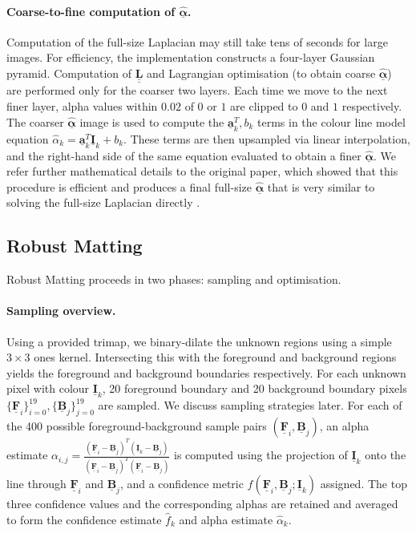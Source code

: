 \documentclass{article}
\theoremstyle{definition}
\def\vt#1{\underline{\mathbf{#1}}}
\def\vts#1{\underline{\boldsymbol{#1}}}
\def\mt#1{\underline{\underline{\mathbf{#1}}}}
\begin{document}
\begin{multicols}{2}[]
\paragraph{Coarse-to-fine computation of $\hat{\vts\alpha}$.} Computation of the full-size Laplacian may still take tens of seconds for large images. For efficiency, the implementation constructs a four-layer Gaussian pyramid. Computation of $\mt L$ and Lagrangian optimisation (to obtain coarse $\hat{\vts\alpha}$) are performed only for the coarser two layers. Each time we move to the next finer layer, alpha values within $0.02$ of $0$ or $1$ are clipped to $0$ and $1$ respectively. The coarser $\hat{\vts\alpha}$ image is used to compute the $\vt a_k^T, b_k$ terms in the colour line model equation $\hat\alpha_k = \vt a_k^T \vt I_k + b_k$. These terms are then upsampled via linear interpolation, and the right-hand side of the same equation evaluated to obtain a finer $\hat{\vts\alpha}$. We refer further mathematical details to the original paper, which showed that this procedure is efficient and produces a final full-size $\hat{\vts\alpha}$ that is very similar to solving the full-size Laplacian directly \cite[\S4]{closed-form-matting}.





\subsection{Robust Matting}
Robust Matting proceeds in two phases: sampling and optimisation.

\paragraph{Sampling overview.} Using a provided trimap, we binary-dilate the unknown regions using a simple $3\times 3$ ones kernel. Intersecting this with the foreground and background regions yields the foreground and background boundaries respectively. For each unknown pixel with colour $\vt I_k$, 20 foreground boundary and 20 background boundary pixels $\{\vt F_i\}_{i=0}^{19}, \{\vt B_j\}_{j=0}^{19}$ are sampled. We discuss sampling strategies later. For each of the 400 possible foreground-background sample pairs $(\vt F_i, \vt B_j)$, an alpha estimate $\alpha_{i,j} = \frac{\left(\vt F_i - \vt B_j\right)^T\left(\vt I_k - \vt B_j\right)}{\left(\vt F_i - \vt B_j\right)^T\left(\vt F_i - \vt B_j\right)}$ is computed using the projection of $\vt I_k$ onto the line through $\vt F_i$ and $\vt B_j$, and a confidence metric $f(\vt F_i, \vt B_j; \vt I_k)$ assigned. The top three confidence values and the corresponding alphas are retained and averaged to form the confidence estimate $\hat f_k$ and alpha estimate $\hat{\alpha}_k$.


\end{multicols}
\end{document}
